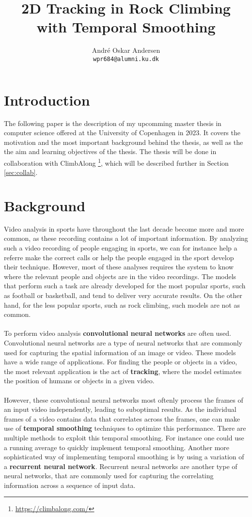 \documentclass[11pt]{article}
\title{2D Tracking in Rock Climbing with Temporal Smoothing}
\author{André Oskar Andersen \\
  \texttt{wpr684@alumni.ku.dk} \\}
\date{}
\begin{document}
\maketitle

\section{Introduction}
The following paper is the description of my upcomming master thesis in computer science offered at the University of Copenhagen in 2023. It covers the motivation and the most important background behind the thesis, as well as the the aim and learning objectives of the thesis. The thesis will be done in collaboration with ClimbAlong \footnote{\url{https://climbalong.com/}}, which will be described further in Section \ref{sec:collab}.

\section{Background}
Video analysis in sports have throughout the last decade become more and more common, as these recording contains a lot of important information. By analyzing such a video recording of people engaging in sports, we can for instance help a referre make the correct calls or help the people engaged in the sport develop their technique. However, most of these analyses requires the system to know where the relevant people and objects are in the video recordings. The models that perform such a task are already developed for the most popular sports, such as football or basketball, and tend to deliver very accurate results. On the other hand, for the less popular sports, such as rock climbing, such models are not as common.
\\
\\
To perform video analysis \textbf{convolutional neural networks} are often used. Convolutional neural networks are a type of neural networks that are commonly used for capturing the spatial information of an image or video. These models have a wide range of applications. For finding the people or objects in a video, the most relevant application is the act of \textbf{tracking}, where the model estimates the position of humans or objects in a given video.
\\
\\
However, these convolutional neural networks most oftenly process the frames of an input video independently, leading to suboptimal results. As the individual frames of a video contains data that correlates across the frames, one can make use of \textbf{temporal smoothing} techniques to optimize this performance. There are multiple methods to exploit this temporal smoothing. For instance one could use a running average to quickly implement temporal smoothing. Another more sophisticated way of implementing temporal smoothing is by using a variation of a \textbf{recurrent neural network}. Recurrent neural networks are another type of neural networks, that are commonly used for capturing the correlating information across a sequence of input data.
\end{document}
